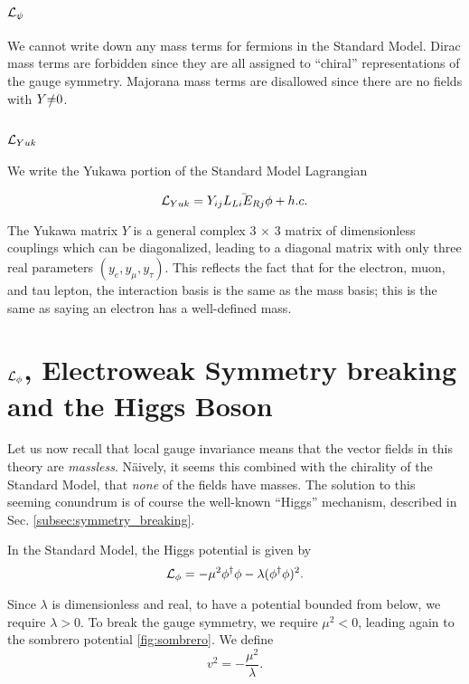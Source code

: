 \subsection{$\mathcal{L}_{\psi}$ }

We cannot write down any mass terms for fermions in the Standard Model.
Dirac mass terms are forbidden since they are all assigned to ``chiral'' representations of the gauge symmetry.
Majorana mass terms are disallowed since there are no fields with $Y \slashed{=} 0$.

\subsection{$\mathcal{L}_{Yuk}$ }

We write the Yukawa portion of the Standard Model Lagrangian

\begin{equation}
\mathcal{L}_{Yuk} = Y_{ij}\bar{L_{Li} E_{Rj}} \phi + h.c.
\end{equation}

The Yukawa matrix $Y$ is a general complex 3 $\times$ 3 matrix of dimensionless couplings which can be diagonalized, leading to a diagonal matrix with only three real parameters $(y_e , y_\mu , y_\tau)$.
This reflects the fact that for the electron, muon, and tau lepton, the interaction basis is the same as the mass basis; this is the same as saying an electron has a well-defined mass.

\section{$\mathcal{L}_\phi$, Electroweak Symmetry breaking and the Higgs Boson}

Let us now recall that local gauge invariance means that the vector fields in this theory are \textit{massless}.
N\"aively, it seems this combined with the chirality of the Standard Model, that \textit{none} of the fields have masses.
The solution to this seeming conundrum is of course the well-known ``Higgs'' mechanism, described in Sec. \ref{subsec:symmetry_breaking}.

In the Standard Model, the Higgs potential is given by
\begin{equation} \label{eq:higgs_potential}
\mathcal{L}_\phi = -\mu^2 \phi^\dagger \phi - \lambda (\phi^\dagger \phi)^2.
\end{equation}

Since $\lambda$ is dimensionless and real, to have a potential bounded from below, we require $\lambda > 0$.
To break the gauge symmetry, we require $\mu^2 < 0$, leading again to the sombrero potential \ref{fig:sombrero}.
We define
\begin{equation}
v^2 = - \frac{\mu^2}{\lambda}.
\end{equation}


